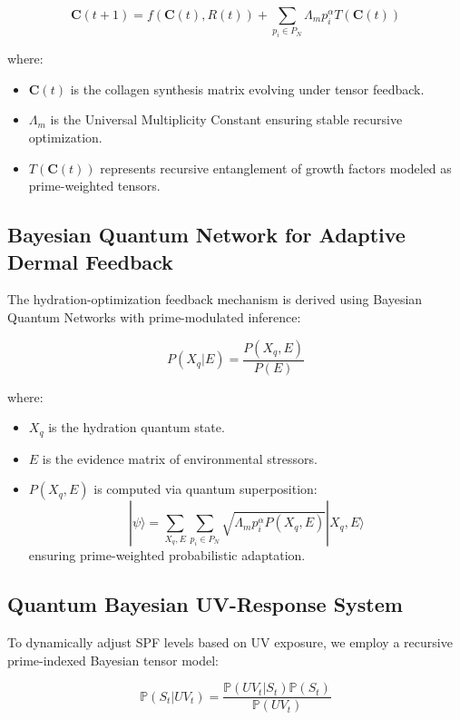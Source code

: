 \documentclass{article}
\theoremstyle{plain}
\theoremstyle{claimstyle}
\begin{document}
\begin{equation}
    \bm{C}(t+1) = f(\bm{C}(t), R(t)) + \sum_{p_i \in P_N} \Lambda_m p_i^{\alpha} T(\bm{C}(t))
\end{equation}

where:
\begin{itemize}
    \item \( \bm{C}(t) \) is the collagen synthesis matrix evolving under tensor feedback.
    \item \( \Lambda_m \) is the Universal Multiplicity Constant ensuring stable recursive optimization.
    \item \( T(\bm{C}(t)) \) represents recursive entanglement of growth factors modeled as prime-weighted tensors.
\end{itemize}

\subsection{Bayesian Quantum Network for Adaptive Dermal Feedback}
The hydration-optimization feedback mechanism is derived using Bayesian Quantum Networks with prime-modulated inference:

\begin{equation}
    P(X_q | E) = \frac{P(X_q, E)}{P(E)}
\end{equation}

where:
\begin{itemize}
    \item \( X_q \) is the hydration quantum state.
    \item \( E \) is the evidence matrix of environmental stressors.
    \item \( P(X_q, E) \) is computed via quantum superposition:
    \begin{equation}
        |\psi \rangle = \sum_{X_q, E} \sum_{p_i \in P_N} \sqrt{\Lambda_m p_i^{\alpha} P(X_q, E)} |X_q, E \rangle
    \end{equation}
    ensuring prime-weighted probabilistic adaptation.
\end{itemize}

\subsection{Quantum Bayesian UV-Response System}
To dynamically adjust SPF levels based on UV exposure, we employ a recursive prime-indexed Bayesian tensor model:

\begin{equation}
\mathbb{P} \left( S_t | UV_t \right) = \frac{\mathbb{P}(UV_t | S_t) \mathbb{P}(S_t)}{\mathbb{P}(UV_t)}
\end{equation}
\end{document}
